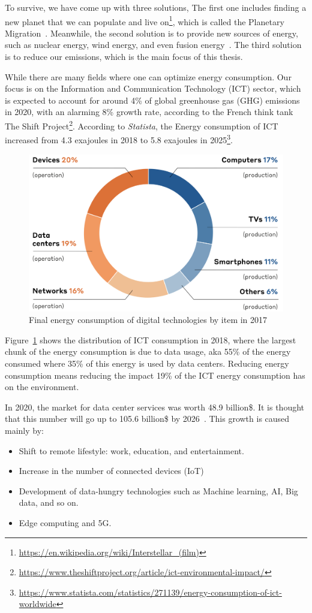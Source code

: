 To survive, we have come up with three solutions,
The first one includes finding a new planet that we can populate and live on\footnote{\url{https://en.wikipedia.org/wiki/Interstellar_(film)}}, which is called the Planetary Migration~\cite{mapstone2022cyanobacteria}.
Meanwhile, the second solution is to provide new sources of energy, such as nuclear energy, wind energy, and even fusion energy~\cite{gross1984fusion}. The third solution is to reduce our emissions, which is the main focus of this thesis.

While there are many fields where one can optimize energy consumption. Our focus is on the Information and Communication Technology (ICT) sector, which is expected to account for around 4\% of global greenhouse gas (GHG) emissions in 2020, with an alarming 8\% growth rate, according to the French think tank The Shift Project\footnote{\url{ https://www.theshiftproject.org/article/ict-environmental-impact/}}. 
According to \emph{Statista}, the Energy consumption of ICT increased from 4.3 exajoules in 2018 to 5.8 exajoules in 2025\footnote{\url{https://www.statista.com/statistics/271139/energy-consumption-of-ict-worldwide}}.
\begin{figure}[!h]
    \includegraphics[width=0.8\linewidth]{chapters/distribution_of_ict_consumption.png}
    \caption{Final energy consumption of digital technologies by item in 2017}
    \label{fig:distribution_of_ict_consumption}
\end{figure}

Figure~\ref{fig:distribution_of_ict_consumption} shows the distribution of ICT consumption in 2018, where the largest chunk of the energy consumption is due to data usage, aka 55\% of the energy consumed where 35\% of this energy is used by data centers. Reducing energy consumption means reducing the impact 19\% of the ICT energy consumption has on the environment. 

In 2020, the market for data center services was worth 48.9 billion\$. It is thought that this number will go up to 105.6 billion\$ by 2026~\cite{inshakova2022data}. This growth is caused mainly by:
\begin{itemize}
    \item Shift to remote lifestyle: work, education, and entertainment.
    \item Increase in the number of connected devices (IoT)
    \item Development of data-hungry technologies such as Machine learning, AI, Big data, and so on.
    \item Edge computing and 5G.
\end{itemize} 

